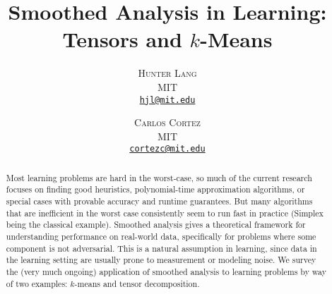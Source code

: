 \documentclass[11pt]{article}
\title{\vspace{-5mm}\fontsize{22pt}{10pt}\selectfont Smoothed Analysis in Learning: Tensors and $k$-Means}
\author{
\large
\textsc{Hunter Lang} \\
\normalsize MIT \\
\normalsize \href{mailto:hjl@mit.edu}{\texttt{hjl@mit.edu}}\\
\and
\textsc{Carlos Cortez} \\
\normalsize MIT \\
\normalsize \href{mailto:cortezc@mit.edu}{\texttt{cortezc@mit.edu}}\\
\vspace{-5mm}
}
\date{}
\theoremstyle{definition}
\begin{document}
\maketitle


\begin{abstract}
\noindent Most learning problems are hard in the worst-case, so much
of the current research focuses on finding good heuristics,
polynomial-time approximation algorithms, or special cases with
provable accuracy and runtime guarantees. But many algorithms that are
inefficient in the worst case consistently seem to run fast in
practice (Simplex being the classical example). Smoothed analysis
gives a theoretical framework for understanding performance on
real-world data, specifically for problems where some component is not
adversarial. This is a natural assumption in learning, since data in
the learning setting are usually prone to measurement or modeling
noise. We survey the (very much ongoing) application of smoothed
analysis to learning problems by way of two examples: $k$-means and
tensor decomposition.
\end{abstract}

\end{document}

